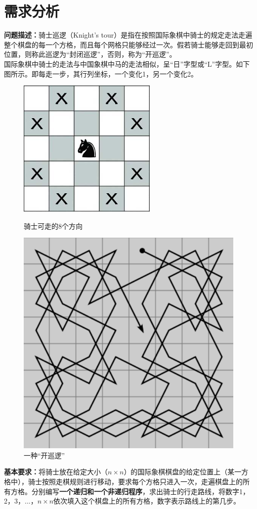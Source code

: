 \documentclass[10pt,a4paper]{article}
\begin{document}
	\section{需求分析}
	\noindent \textbf{问题描述：}骑士巡逻（Knight's tour）是指在按照国际象棋中骑士的规定走法走遍整个棋盘的每一个方格，而且每个网格只能够经过一次。假若骑士能够走回到最初位置，则称此巡逻为“封闭巡逻”，否则，称为“开巡逻”。\\
	国际象棋中骑士的走法与中国象棋中马的走法相似，呈“日”字型或“L”字型。如下图所示。即每走一步，其行列坐标，一个变化1，另一个变化2。
	\begin{figure}[htbp]
		\centering
		\begin{minipage}{0.49\linewidth}
			\centering
			\includegraphics[width=0.5\linewidth]{Knight's Tour}
			\caption{骑士可走的8个方向}
		\end{minipage}
		\begin{minipage}{0.49\linewidth}
			\centering
			\includegraphics[width=0.5\linewidth]{Result}
			\caption{一种“开巡逻”}
		\end{minipage}		
	\end{figure}
	
	\noindent \textbf{基本要求：}将骑士放在给定大小（$n\times n$）的国际象棋棋盘的给定位置上（某一方格中），骑士按照走棋规则进行移动，要求每个方格只进入一次，走遍棋盘上的所有方格。分别编写\textbf{一个递归和一个非递归程序}，求出骑士的行走路线，将数字1，2，3，...，$n\times n$依次填入这个棋盘上的所有方格，数字表示路线上的第几步。\\
	
\end{document}
